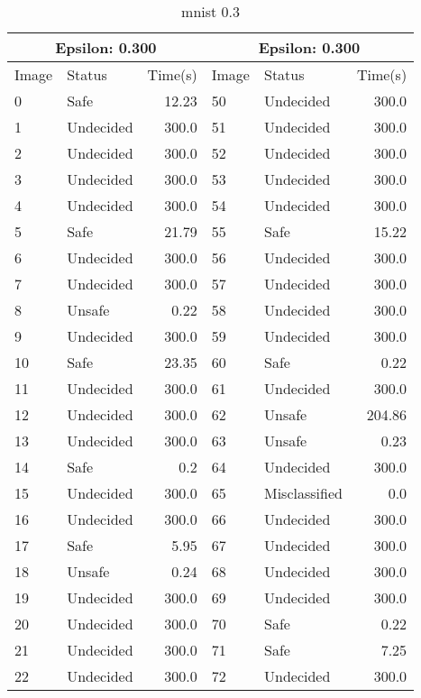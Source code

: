 \begin{table}[!ht]
  \centering
  \caption{mnist 0.3}
  \footnotesize
  \begin{tabular}{|llr|llr|}
    \toprule
    \multicolumn{3}{|c|}{Epsilon: 0.300} & \multicolumn{3}{|c|}{Epsilon: 0.300} \\
    \midrule
    Image & Status & Time(s) &Image & Status & Time(s)\\ 
    \midrule
    0 & Safe & 12.23 &    50 & Undecided & 300.0\\ 
    1 & Undecided & 300.0 &    51 & Undecided & 300.0\\ 
    2 & Undecided & 300.0 &    52 & Undecided & 300.0\\ 
    3 & Undecided & 300.0 &    53 & Undecided & 300.0\\ 
    4 & Undecided & 300.0 &    54 & Undecided & 300.0\\ 
    5 & Safe & 21.79 &    55 & Safe & 15.22\\ 
    6 & Undecided & 300.0 &    56 & Undecided & 300.0\\ 
    7 & Undecided & 300.0 &    57 & Undecided & 300.0\\ 
    8 & Unsafe & 0.22 &    58 & Undecided & 300.0\\ 
    9 & Undecided & 300.0 &    59 & Undecided & 300.0\\ 
    10 & Safe & 23.35 &    60 & Safe & 0.22\\ 
    11 & Undecided & 300.0 &    61 & Undecided & 300.0\\ 
    12 & Undecided & 300.0 &    62 & Unsafe & 204.86\\ 
    13 & Undecided & 300.0 &    63 & Unsafe & 0.23\\ 
    14 & Safe & 0.2 &    64 & Undecided & 300.0\\ 
    15 & Undecided & 300.0 &    65 & Misclassified & 0.0\\ 
    16 & Undecided & 300.0 &    66 & Undecided & 300.0\\ 
    17 & Safe & 5.95 &    67 & Undecided & 300.0\\ 
    18 & Unsafe & 0.24 &    68 & Undecided & 300.0\\ 
    19 & Undecided & 300.0 &    69 & Undecided & 300.0\\ 
    20 & Undecided & 300.0 &    70 & Safe & 0.22\\ 
    21 & Undecided & 300.0 &    71 & Safe & 7.25\\ 
    22 & Undecided & 300.0 &    72 & Undecided & 300.0\\ 

\end{tabular}
\end{table}
